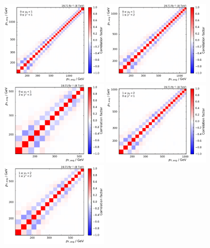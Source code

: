 \begin{figure}[htbp]
    \centering
    \includegraphics[width=0.47\textwidth]{figures/measurement/unf_nlo_corr_yb0ys0.pdf}\hfill
    \includegraphics[width=0.47\textwidth]{figures/measurement/unf_nlo_corr_yb0ys1.pdf}
    \includegraphics[width=0.47\textwidth]{figures/measurement/unf_nlo_corr_yb0ys2.pdf}\hfill
    \includegraphics[width=0.47\textwidth]{figures/measurement/unf_nlo_corr_yb1ys0.pdf}
    \includegraphics[width=0.47\textwidth]{figures/measurement/unf_nlo_corr_yb1ys1.pdf}\hfill

\end{figure}
